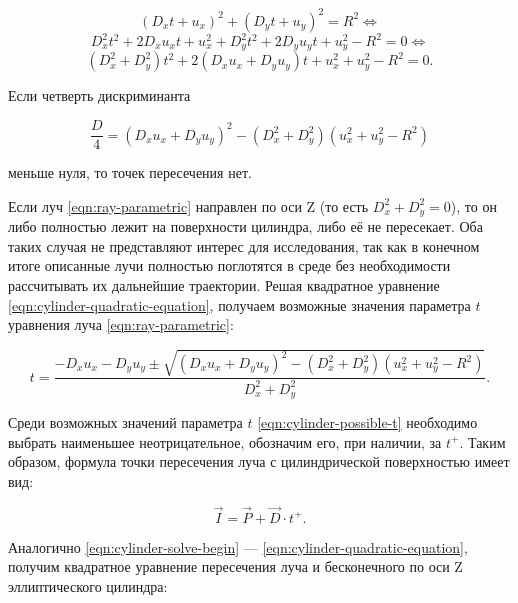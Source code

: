 \begin{equation}
	(D_x t + u_x)^2 + (D_y t + u_y)^2 = R^2 \Leftrightarrow
\end{equation}
\begin{equation}
	D_x^2 t^2 + 2D_x u_x t + u_x^2 + D_y^2 t^2 + 2D_y u_y t + u_y^2 - R^2 = 0 \Leftrightarrow
\end{equation}
\begin{equation}
	\label{eqn:cylinder-quadratic-equation}
	\left(D_x^2 + D_y^2\right) t^2 + 2(D_x u_x + D_y u_y)t + u_x^2 + u_y^2 - R^2 = 0.
\end{equation}

Если четверть дискриминанта

\begin{equation}
	\frac D4 = (D_x u_x + D_y u_y)^2 - \left(D_x^2 + D_y^2\right)\left(u_x^2 + u_y^2-R^2\right)
\end{equation}

\noindent меньше нуля, то точек пересечения нет.

Если луч \eqref{eqn:ray-parametric} направлен по оси Z (то есть $D_x^2 + D_y^2 = 0$), то он либо полностью лежит на поверхности цилиндра, либо её не пересекает.
Оба таких случая не представляют интерес для исследования, так как в конечном итоге описанные лучи полностью поглотятся в среде без необходимости рассчитывать их дальнейшие траектории.
Решая квадратное уравнение \eqref{eqn:cylinder-quadratic-equation}, получаем возможные значения параметра $t$ уравнения луча \eqref{eqn:ray-parametric}:

\begin{equation}
	\label{eqn:cylinder-possible-t}
	t = \frac{-D_x u_x - D_y u_y \pm \sqrt{(D_x u_x + D_y u_y)^2 - \left(D_x^2 + D_y^2\right)\left(u_x^2 + u_y^2 - R^2\right)}}{D_x^2+D_y^2}.
\end{equation}

Среди возможных значений параметра $t$ \eqref{eqn:cylinder-possible-t} необходимо выбрать наименьшее неотрицательное, обозначим его, при наличии, за $t^+$.
Таким образом, формула точки пересечения луча с цилиндрической поверхностью имеет вид:

\begin{equation}
	\vec I = \vec P + \vec D \cdot t^+.
\end{equation}

Аналогично \eqref{eqn:cylinder-solve-begin} — \eqref{eqn:cylinder-quadratic-equation}, получим квадратное уравнение пересечения луча и бесконечного по оси Z эллиптического цилиндра:


